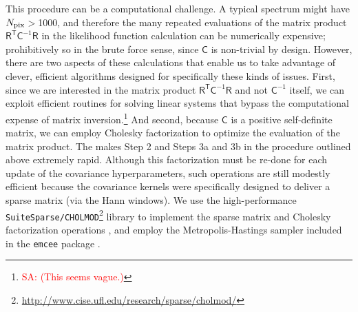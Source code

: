 \documentclass[iop,floatfix]{emulateapj}
\newcommand{\vD}{\mathsf{D}}
\newcommand{\vR}{\mathsf{R}}
\newcommand{\vC}{\mathsf{C}}
\newcommand{\trans}{\mathsf{T}}
\newcommand{\vt}{ {\bm \theta}}
\newcommand{\vT}{ {\bm \Theta}}
\newcommand{\vp}{ {\bm \phi}}
\newcommand{\cheb}{ \vp_{\mathsf{P}}}
\newcommand{\cov}{ \vp_{\mathsf{C}}}
\newcommand{\allParameters}{\vT} %
\newcommand{\comm}[1]{ \textcolor{red}{SA: #1}}
\begin{document}
This procedure can be a computational challenge.  A typical spectrum might have $N_{\rm 
pix}$$>$1000, and therefore the many repeated evaluations of the matrix product $\vR^{\trans} 
\vC^{-1} \vR$ in the likelihood function calculation can be numerically expensive; prohibitively so 
in the brute force sense, since $\vC$ is non-trivial by design.  However, there are two aspects of 
these calculations that enable us to take advantage of clever, efficient algorithms designed for 
specifically these kinds of issues.  First, since we are interested in the matrix product 
$\vR^{\trans} \vC^{-1} \vR$ and not $\vC^{-1}$ itself, we can exploit efficient routines for 
solving linear systems that bypass the computational expense of matrix inversion.\footnote{\comm{(This seems vague.)}}  And second, because $\vC$ is a positive self-definite 
matrix, we can employ Cholesky factorization to optimize the evaluation of the matrix product.  The 
makes Step 2 and Steps 3a and 3b in the procedure outlined above extremely rapid.  Although this 
factorization must be re-done for each update of the covariance hyperparameters, such operations 
are still modestly efficient because the covariance kernels were specifically designed to deliver a 
sparse matrix (via the Hann windows).  We use the high-performance \texttt{SuiteSparse/CHOLMOD}\footnote{\url{http://www.cise.ufl.edu/research/sparse/cholmod/}} library to implement the sparse 
matrix and Cholesky factorization operations \citep{chen08,davis09}, and employ the 
Metropolis-Hastings sampler included in the {\tt emcee} package \citep{foreman-mackey13}.


\end{document}
